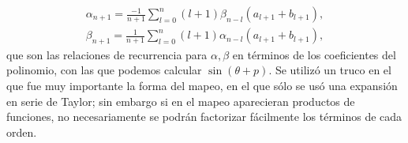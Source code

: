 \begin{eqnarray}
\alpha_{n+1}=\frac{-1}{n+1}\sum_{l=0}^{n}(l+1)\beta_{n-l}(a_{l+1}+b_{l+1}),
\label{recurrencia alpha}
\end{eqnarray}
\begin{eqnarray}
\beta_{n+1}=\frac{1}{n+1}\sum_{l=0}^{n}(l+1)\alpha_{n-l}(a_{l+1}+b_{l+1}),
\label{recurrencia beta}
\end{eqnarray}
que son las relaciones de recurrencia para $\alpha,\beta$ en términos de los coeficientes del polinomio, con las que podemos calcular $\sin(\theta+p)$. Se utilizó un truco en el que fue muy importante la forma del mapeo, en el que sólo se usó una expansión en serie de Taylor; sin embargo si en el mapeo aparecieran productos de funciones, no necesariamente se podrán factorizar fácilmente los términos de cada orden.\\

